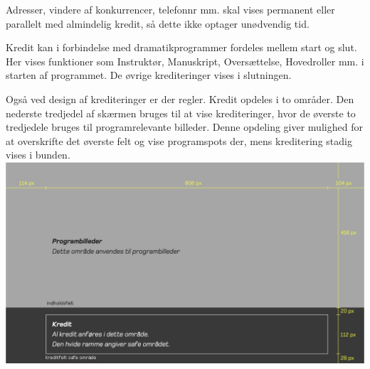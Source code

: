 Adresser, vindere af konkurrencer, telefonnr mm. skal vises permanent eller parallelt med almindelig kredit, så dette ikke optager unødvendig tid.

Kredit kan i forbindelse med dramatikprogrammer fordeles mellem start og slut. Her vises funktioner som Instruktør, Manuskript, Oversættelse, Hovedroller mm. i starten af programmet. De øvrige krediteringer vises i slutningen.

Også ved design af krediteringer er der regler. Kredit opdeles i to områder. Den nederste tredjedel af skærmen bruges til at vise krediteringer, hvor de øverste to tredjedele bruges til programrelevante billeder. Denne opdeling giver mulighed for at overskrifte det øverste felt og vise programspots der, mens kreditering stadig vises i bunden. \\

\includegraphics[scale=0.42]{figures/2. Faglig vidensgrundlag/Kredit Design.png}